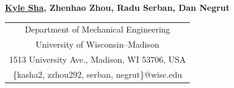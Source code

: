 \documentclass{acmd2026_fullpaper}
\begin{document}
\begin{center}
\end{center}

\begin{center}
\normalsize{\bf{
  \underline{Kyle Sha}, Zhenhao Zhou, Radu Serban, Dan Negrut}}
\end{center}

\begin{center}
  \begin{tabular}{c}
    Department of Mechanical Engineering \\
    University of Wisconsin--Madison \\
    1513 University Ave., Madison, WI 53706, USA \\
    \{kasha2, zzhou292, serban, negrut\}@wisc.edu \\
  \end{tabular}
\end{center}

\end{document}
